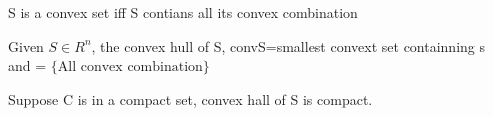 \begin{lemma}
    S is a convex set iff S contians all its convex combination
\end{lemma}

\begin{definition}
    Given $S\in R^n$, the convex hull of S, convS=smallest convext set containning s\\
    and = $\{\text{All convex combination}\}$

\end{definition}

\begin{lemma}
    Suppose C is in a compact set, convex hall of S is compact.
\end{lemma}